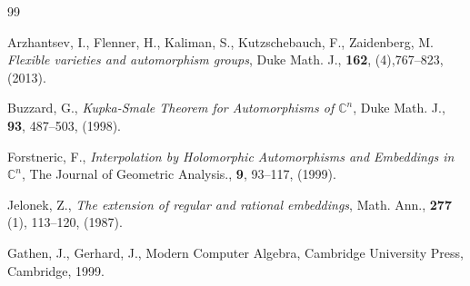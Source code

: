 \documentclass{amsart}
\newcommand{\C}{\mathbb{C}}
\begin{document}
\begin{thebibliography}{99}


 Arzhantsev, I.,   Flenner, H.,  Kaliman, S.,  Kutzschebauch, F.,  Zaidenberg, M.
 {\em Flexible varieties and automorphism groups}, 
  Duke Math. J., \textbf{162}, (4),767--823,  (2013).



 Buzzard, G.,
 {\em Kupka-Smale Theorem for Automorphisms of $\C^n$}, Duke Math. J., \textbf{93}, 487--503, (1998).
 
Forstneric, F., 
{\em  Interpolation by Holomorphic
Automorphisms and Embeddings in $\C^n$}, 
The Journal of Geometric Analysis.,
\textbf{9}, 93--117, (1999).


Jelonek, Z., 
{\em The extension of regular and rational embeddings},
Math. Ann.,  \textbf{277}  (1), 113--120, (1987).



Gathen, J.,  Gerhard, J.,
Modern Computer Algebra,
Cambridge University Press, Cambridge, 1999.
 
 \end{thebibliography}
\end{document}
